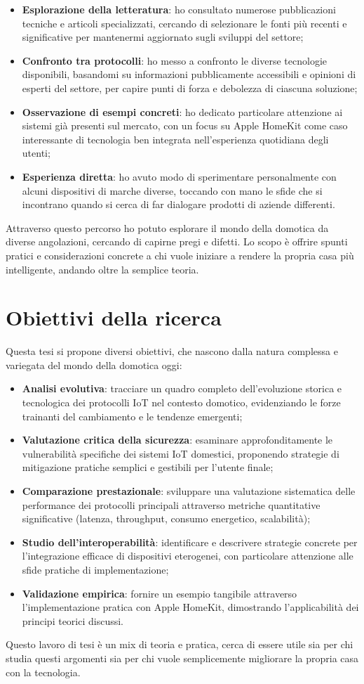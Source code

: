 \begin{itemize}
\item \textbf{Esplorazione della letteratura}: ho consultato numerose pubblicazioni tecniche e articoli specializzati, cercando di selezionare le fonti più recenti e significative per mantenermi aggiornato sugli sviluppi del settore;
\item \textbf{Confronto tra protocolli}: ho messo a confronto le diverse tecnologie disponibili, basandomi su informazioni pubblicamente accessibili e opinioni di esperti del settore, per capire punti di forza e debolezza di ciascuna soluzione;
\item \textbf{Osservazione di esempi concreti}: ho dedicato particolare attenzione ai sistemi già presenti sul mercato, con un focus su Apple HomeKit come caso interessante di tecnologia ben integrata nell'esperienza quotidiana degli utenti;
\item \textbf{Esperienza diretta}: ho avuto modo di sperimentare personalmente con alcuni dispositivi di marche diverse, toccando con mano le sfide che si incontrano quando si cerca di far dialogare prodotti di aziende differenti.
\end{itemize}

Attraverso questo percorso ho potuto esplorare il mondo della domotica da diverse angolazioni, cercando di capirne pregi e difetti. Lo scopo è offrire spunti pratici e considerazioni concrete a chi vuole iniziare a rendere la propria casa più intelligente, andando oltre la semplice teoria.

\section{Obiettivi della ricerca}
Questa tesi si propone diversi obiettivi, che nascono dalla natura complessa e variegata del mondo della domotica oggi:

\begin{itemize}
\item \textbf{Analisi evolutiva}: tracciare un quadro completo dell'evoluzione storica e tecnologica dei protocolli IoT nel contesto domotico, evidenziando le forze trainanti del cambiamento e le tendenze emergenti;
\item \textbf{Valutazione critica della sicurezza}: esaminare approfonditamente le vulnerabilità specifiche dei sistemi IoT domestici, proponendo strategie di mitigazione pratiche semplici e gestibili per l'utente finale;
\item \textbf{Comparazione prestazionale}: sviluppare una valutazione sistematica delle performance dei protocolli principali attraverso metriche quantitative significative (latenza, throughput, consumo energetico, scalabilità);
\item \textbf{Studio dell'interoperabilità}: identificare e descrivere strategie concrete per l'integrazione efficace di dispositivi eterogenei, con particolare attenzione alle sfide pratiche di implementazione;
\item \textbf{Validazione empirica}: fornire un esempio tangibile attraverso l'implementazione pratica con Apple HomeKit, dimostrando l'applicabilità dei principi teorici discussi.
\end{itemize}

Questo lavoro di tesi è un mix di teoria e pratica, cerca di essere utile sia per chi studia questi argomenti sia per chi vuole semplicemente migliorare la propria casa con la tecnologia.